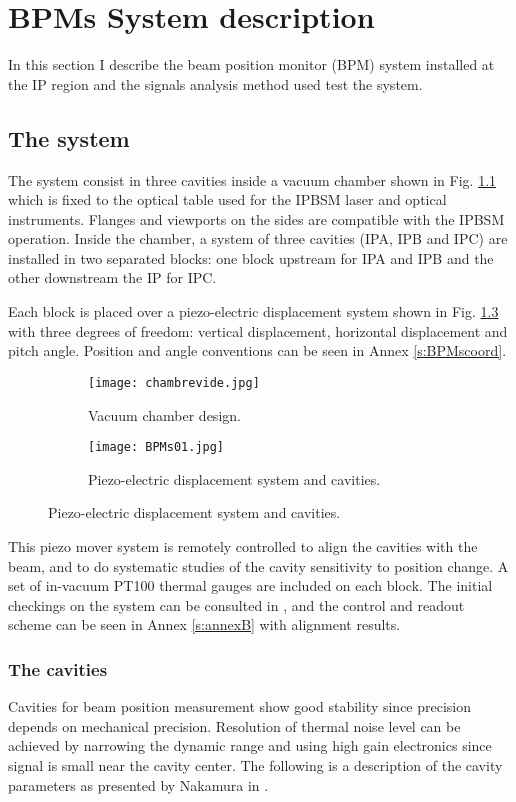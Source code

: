 \chapter{BPMs System description}
In this section I describe the beam position monitor (BPM) system installed at the IP region and the signals analysis method used test the system.\par
\section{The system}
The system consist in three cavities inside a vacuum chamber shown in Fig. \ref{f:vacuumchamberdes} which is fixed to the optical table used for the IPBSM laser and optical instruments. Flanges and viewports on the sides are compatible with the IPBSM operation. Inside the chamber, a system of three cavities (IPA, IPB and IPC) are installed in two separated blocks: one block upstream for IPA and IPB and the other downstream the IP for IPC.\par
Each block is placed over a piezo-electric displacement system shown in Fig. \ref{f:piezosystem} with three degrees of freedom: vertical displacement, horizontal displacement and pitch angle. Position and angle conventions can be seen in Annex \ref{s:BPMscoord}. \par
\begin{figure}[htb]
\centering
\begin{subfigure}{0.4\textwidth}
 \texttt{[image: chambrevide.jpg]}\caption{Vacuum chamber design.}\label{f:vacuumchamberdes}
\end{subfigure}
\begin{subfigure}{0.5\textwidth}
 \texttt{[image: BPMs01.jpg]}\caption{Piezo-electric displacement system and cavities.}\label{f:piezosystem}
\end{subfigure}
\end{figure}
This piezo mover system is remotely controlled to align the cavities with the beam, and to do systematic studies of the cavity sensitivity to position change. A set of in-vacuum PT100 thermal gauges are included on each block. The initial checkings on the system can be consulted in \cite{Bambade2013}, and the control and readout scheme can be seen in Annex \ref{s:annexB} with alignment results.\par
\subsection{The cavities}
Cavities for beam position measurement show good stability since precision depends on mechanical precision. Resolution of thermal noise level can be achieved by narrowing the dynamic range and using high gain electronics since signal is small near the cavity center. The following is a description of the cavity parameters as presented by Nakamura in \cite{Nakathese}.\par
